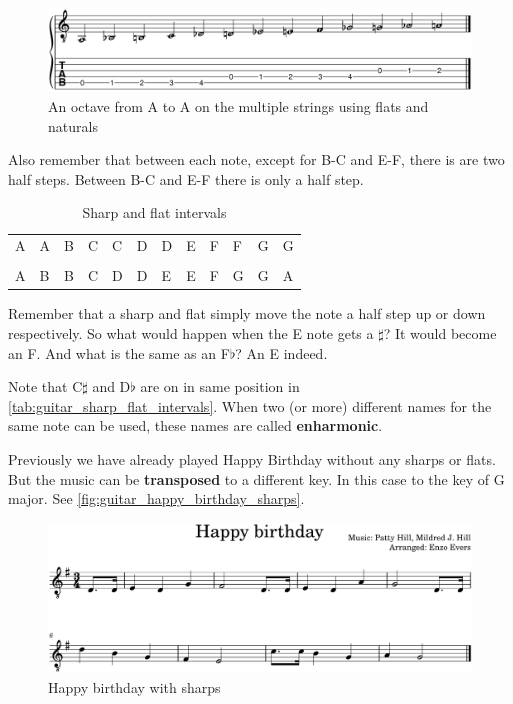 \begin{figure}[h]
	\centering
	\includegraphics[width=\textwidth]{../../MuseScore/Guitar/PitchesFlatsMultiString.png}
	\caption{An octave from A to A on the multiple strings using flats and naturals}
	\label{fig:guitar_string_a_octave_multi_string_flats_chap_music_notation}
\end{figure}

Also remember that between each note, except for B-C and E-F, there is are two half steps. Between B-C and E-F there is only a half step.

\begin{table}[h]
	\centering
	\begin{NiceTabular}{*{12}{P{5mm}}}
		\large{A} & \large{A\sharp} & \large{B} & \large{C} & \large{C\sharp} & \large{D} & \large{D\sharp} & \large{E} & \large{F} & \large{F\sharp} & \large{G} & \large{G\sharp} \\ \\
		\large{A} & \large{B\flat} & \large{B} & \large{C} & \large{D\flat} & \large{D} & \large{E\flat} & \large{E} & \large{F} & \large{G\flat}& \large{G} & \large{A\flat}
	\end{NiceTabular}
	\caption{Sharp and flat intervals}
	\label{tab:guitar_sharp_flat_intervals}
\end{table}

Remember that a sharp and flat simply move the note a half step up or down respectively. So what would happen when the E note gets a $\sharp$? It would become an F. And what is the same as an F$\flat$? An E indeed. 

Note that C$\sharp$ and D$\flat$ are on in same position in \autoref{tab:guitar_sharp_flat_intervals}. When two (or more) different names for the same note can be used, these names are called \textbf{enharmonic}.

\newpage

Previously we have already played Happy Birthday without any sharps or flats. But the music can be \textbf{transposed} to a different key. In this case to the key of G major. See \autoref{fig:guitar_happy_birthday_sharps}.

\begin{figure}[h]
	\centering
	\includegraphics[width=\textwidth]{../../MuseScore/Guitar/GuitarHappyBirthdaySharps.png}
	\caption{Happy birthday with sharps}
	\label{fig:guitar_happy_birthday_sharps}
\end{figure}


